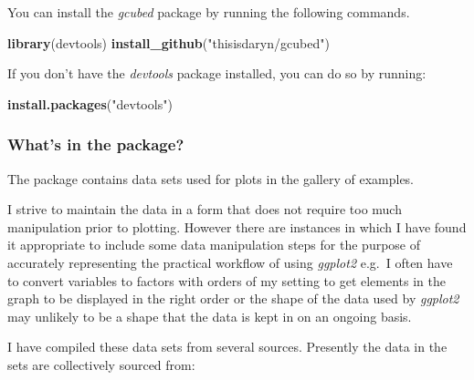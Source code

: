\documentclass[]{book}
\newenvironment{Shaded}{\begin{snugshade}}{\end{snugshade}}
\newcommand{\KeywordTok}[1]{\textcolor[rgb]{0.13,0.29,0.53}{\textbf{#1}}}
\newcommand{\NormalTok}[1]{#1}
\newcommand{\StringTok}[1]{\textcolor[rgb]{0.31,0.60,0.02}{#1}}
\begin{document}
You can install the \emph{gcubed} package by running the following commands.

\begin{Shaded}
\begin{Highlighting}[]
\KeywordTok{library}\NormalTok{(devtools)}
\KeywordTok{install_github}\NormalTok{(}\StringTok{"thisisdaryn/gcubed"}\NormalTok{)}
\end{Highlighting}
\end{Shaded}

If you don't have the \emph{devtools} package installed, you can do so by running:

\begin{Shaded}
\begin{Highlighting}[]
\KeywordTok{install.packages}\NormalTok{(}\StringTok{"devtools"}\NormalTok{)}
\end{Highlighting}
\end{Shaded}

\hypertarget{gcubedwhat}{%
\subsubsection*{What's in the package?}\label{gcubedwhat}}

The package contains data sets used for plots in the gallery of examples.

I strive to maintain the data in a form that does not require too much manipulation prior to plotting. However there are instances in which I have found it appropriate to include some data manipulation steps for the purpose of accurately representing the practical workflow of using \emph{ggplot2} e.g.~I often have to convert variables to factors with orders of my setting to get elements in the graph to be displayed in the right order or the shape of the data used by \emph{ggplot2} may unlikely to be a shape that the data is kept in on an ongoing basis.

I have compiled these data sets from several sources. Presently the data in the sets are collectively sourced from:
\end{document}
